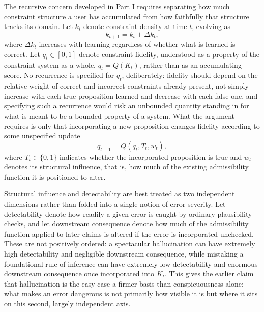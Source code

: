 \documentclass[11pt]{article}
\begin{document}
The recursive concern developed in Part I requires separating how much constraint structure a user has accumulated from how faithfully that structure tracks its domain. Let $k_t$ denote constraint density at time $t$, evolving as
\[
k_{t+1} = k_t + \Delta k_t,
\]
where $\Delta k_t$ increases with learning regardless of whether what is learned is correct. Let $q_t \in [0,1]$ denote constraint fidelity, understood as a property of the constraint system as a whole, $q_t = Q(K_t)$, rather than as an accumulating score. No recurrence is specified for $q_t$, deliberately: fidelity should depend on the relative weight of correct and incorrect constraints already present, not simply increase with each true proposition learned and decrease with each false one, and specifying such a recurrence would risk an unbounded quantity standing in for what is meant to be a bounded property of a system. What the argument requires is only that incorporating a new proposition changes fidelity according to some unspecified update
\[
q_{t+1} = Q(q_t, T_t, w_t),
\]
where $T_t \in \{0,1\}$ indicates whether the incorporated proposition is true and $w_t$ denotes its structural influence, that is, how much of the existing admissibility function it is positioned to alter.

Structural influence and detectability are best treated as two independent dimensions rather than folded into a single notion of error severity. Let detectability denote how readily a given error is caught by ordinary plausibility checks, and let downstream consequence denote how much of the admissibility function applied to later claims is altered if the error is incorporated unchecked. These are not positively ordered: a spectacular hallucination can have extremely high detectability and negligible downstream consequence, while mistaking a foundational rule of inference can have extremely low detectability and enormous downstream consequence once incorporated into $K_t$. This gives the earlier claim that hallucination is the easy case a firmer basis than conspicuousness alone; what makes an error dangerous is not primarily how visible it is but where it sits on this second, largely independent axis.
\end{document}

